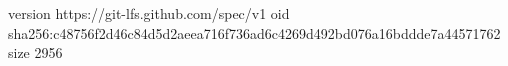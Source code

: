 version https://git-lfs.github.com/spec/v1
oid sha256:c48756f2d46c84d5d2aeea716f736ad6c4269d492bd076a16bddde7a44571762
size 2956
